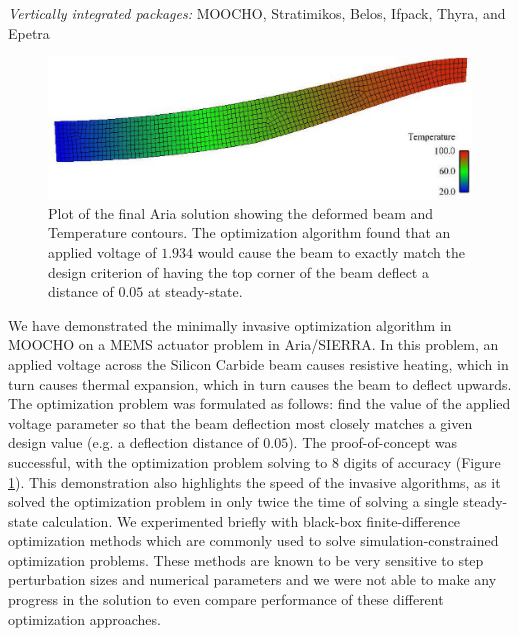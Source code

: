 \documentclass[pdf,ps2pdf,11pt]{SANDreport}
\begin{document}
{{}\noindent\textit{Vertically integrated packages:} MOOCHO, Stratimikos,
Belos, Ifpack, Thyra, and Epetra

{\bsinglespace
\begin{figure}
\begin{center}
\includegraphics*[angle=0,scale=0.40
]{SiC_dY0.1.eps}
\end{center}
\caption[Final optimization solution for Aria MEMS actuator design problem]{
\label{fig:ariaFinal}
Plot of the final Aria solution showing the deformed beam and Temperature
contours. The optimization algorithm found that an applied voltage of $1.934$
would cause the beam to exactly match the design criterion of having the top
corner of the beam deflect a distance of $0.05$ at steady-state.  }
\end{figure}
\esinglespace}

We have demonstrated the minimally invasive optimization algorithm in MOOCHO
on a MEMS actuator problem in Aria/SIERRA.  In this problem, an applied
voltage across the Silicon Carbide beam causes resistive heating, which in
turn causes thermal expansion, which in turn causes the beam to deflect
upwards. The optimization problem was formulated as follows: find the value of
the applied voltage parameter so that the beam deflection most closely matches
a given design value (e.g. a deflection distance of $0.05$). The proof-of-concept was successful, with the
optimization problem solving to $8$ digits of accuracy (Figure
{}\ref{fig:ariaFinal}). This demonstration also highlights the speed of the
invasive algorithms, as it solved the optimization problem in only twice the
time of solving a single steady-state calculation.  We experimented briefly
with black-box finite-difference optimization methods which are commonly
used to solve simulation-constrained optimization problems.  These methods
are known to be very sensitive to step perturbation sizes and numerical
parameters and we were not able to make any progress in the solution
to even compare performance of these different optimization approaches.

}
\end{document}
